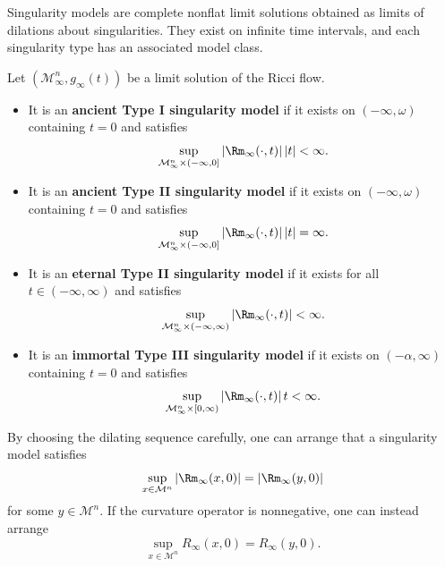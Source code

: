 \begin{remark}
\label{ch08-rem-singularity-models}
Singularity models are complete nonflat limit solutions obtained as limits of dilations about singularities. They exist on infinite time intervals, and each singularity type has an associated model class.
\end{remark}

\begin{definition}
\label{ch08-def-model-types}
Let \((\mathcal M_\infty^n,g_\infty(t))\) be a limit solution of the Ricci flow.
\begin{itemize}
\item It is an \textbf{ancient Type I singularity model} if it exists on \((-\infty,\omega)\) containing \(t=0\) and satisfies
\[
\sup_{\mathcal M_\infty^n\times(-\infty,0]} |\Rm_\infty(\cdot,t)|\,|t|<\infty.
\]
\item It is an \textbf{ancient Type II singularity model} if it exists on \((-\infty,\omega)\) containing \(t=0\) and satisfies
\[
\sup_{\mathcal M_\infty^n\times(-\infty,0]} |\Rm_\infty(\cdot,t)|\,|t|=\infty.
\]
\item It is an \textbf{eternal Type II singularity model} if it exists for all \(t\in(-\infty,\infty)\) and satisfies
\[
\sup_{\mathcal M_\infty^n\times(-\infty,\infty)} |\Rm_\infty(\cdot,t)|<\infty.
\]
\item It is an \textbf{immortal Type III singularity model} if it exists on \((-\alpha,\infty)\) containing \(t=0\) and satisfies
\[
\sup_{\mathcal M_\infty^n\times[0,\infty)} |\Rm_\infty(\cdot,t)|\,t<\infty.
\]
\end{itemize}
\end{definition}

\begin{remark}
\label{ch08-rem-point-picking}
By choosing the dilating sequence carefully, one can arrange that a singularity model satisfies
\[
\sup_{x\in \mathcal M^n} |\Rm_\infty(x,0)|=|\Rm_\infty(y,0)|
\]
for some \(y\in\mathcal M^n\). If the curvature operator is nonnegative, one can instead arrange
\[
\sup_{x\in \mathcal M^n} R_\infty(x,0)=R_\infty(y,0).
\]
\end{remark}

